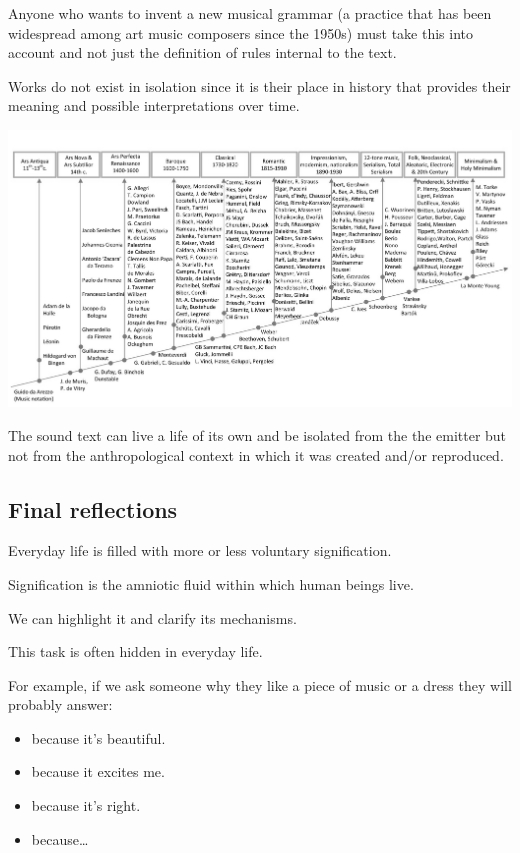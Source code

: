 Anyone who wants to invent a new musical grammar (a practice that has been widespread among art music composers since the 1950s) must take this into account and not just the definition of rules internal to the text.

Works do not exist in isolation since it is their place in history that provides their meaning and possible interpretations over time.

\begin{center}
\includegraphics[scale=1]{../img/lineatempo.png}
\end{center}

The sound text can live a life of its own and be isolated from the the emitter but not from the anthropological context in which it was created and/or reproduced.

\subsection{Final reflections}\label{final-reflections}

Everyday life is filled with more or less voluntary signification.

Signification is the amniotic fluid within which human beings live.

We can highlight it and clarify its mechanisms.

This task is often hidden in everyday life.

For example, if we ask someone why they like a piece of music or a dress they will probably answer:

\begin{itemize}
\tightlist
\item because it's beautiful.
\item because it excites me.
\item because it's right.
\item because\ldots{}
\end{itemize}

